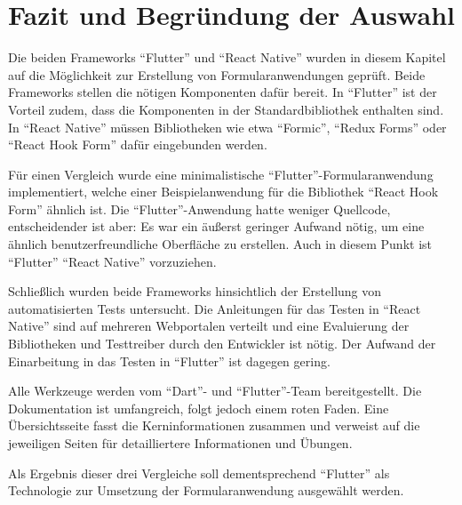 \section{Fazit und Begründung der Auswahl}
\label{sec:Fazit-und-Begründung-der-Auswahl}



Die beiden Frameworks \enquote{Flutter} und \enquote{React Native} wurden in diesem Kapitel auf die Möglichkeit zur Erstellung von Formularanwendungen geprüft.
Beide Frameworks stellen die nötigen Komponenten dafür bereit.
In \enquote{Flutter} ist der Vorteil zudem, dass die Komponenten in der Standardbibliothek enthalten sind.
In \enquote{React Native} müssen Bibliotheken wie etwa \enquote{Formic}, \enquote{Redux Forms} oder \enquote{React Hook Form} dafür eingebunden werden.

Für einen Vergleich wurde eine minimalistische \enquote{Flutter}-Formularanwendung implementiert,
welche einer Beispielanwendung für die Bibliothek \enquote{React Hook Form} ähnlich ist.
Die \enquote{Flutter}-Anwendung hatte weniger Quellcode,
entscheidender ist aber: Es war ein äußerst geringer Aufwand nötig,
um eine ähnlich benutzerfreundliche Oberfläche zu erstellen.
Auch in diesem Punkt ist \enquote{Flutter} \enquote{React Native} vorzuziehen.

Schließlich wurden beide Frameworks hinsichtlich der Erstellung von automatisierten Tests untersucht.
Die Anleitungen für das Testen in \enquote{React Native} sind auf mehreren Webportalen verteilt und eine Evaluierung der Bibliotheken und Testtreiber durch den Entwickler ist nötig.
Der Aufwand der Einarbeitung in das Testen in \enquote{Flutter} ist dagegen gering.


Alle Werkzeuge werden vom \enquote{Dart}- und \enquote{Flutter}-Team bereitgestellt.
Die Dokumentation ist umfangreich, folgt jedoch einem roten Faden.
Eine Übersichtsseite fasst die Kerninformationen zusammen und verweist auf die jeweiligen  Seiten für detailliertere Informationen und Übungen.

Als Ergebnis dieser drei Vergleiche soll dementsprechend \enquote{Flutter} als Technologie zur Umsetzung der Formularanwendung ausgewählt werden.
